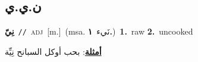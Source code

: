 \documentclass[10pt,a4paper,twoside]{article} %
\begin{document}
\begin{multicols}{2}
\vspace{-3mm}
\subsection*{\color{blue}\foreignlanguage{arabic}{ن.ي.ي}\color{blue}{}} 

{\setlength\topsep{0pt}\textbf{\foreignlanguage{arabic}{نِيّ}}\ {\color{gray}\texttt{//}\color{black}}\ \textsc{adj}\ [m.]\ \color{gray}(msa. \foreignlanguage{arabic}{نَيء}~\foreignlanguage{arabic}{\textbf{١.}})\color{black}\ \textbf{1.}~raw  \textbf{2.}~uncooked\  \begin{flushright}\color{gray}\foreignlanguage{arabic}{\textbf{\underline{\foreignlanguage{arabic}{أمثلة}}}: بحب أوكل السبانح نِيِّة}\end{flushright}\color{black}} \vspace{2mm}

\end{multicols}
\end{document}
